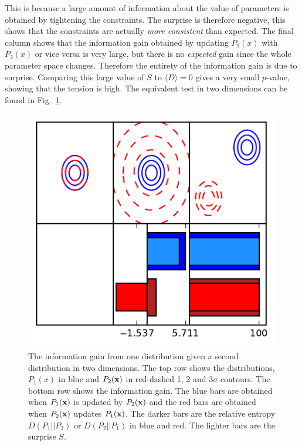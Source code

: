 \documentclass[twocolumn]{revtex4-1}
\begin{document}
    This is because a large amount of information about the value of parameters is obtained by tightening the constraints.
    The surprise is therefore negative, this shows that the constraints are actually \emph{more consistent} than expected.
    The final column shows that the information gain obtained by updating $P_1(x)$ with $P_2(x)$ or vice versa is very large, but there is no \emph{expected} gain since the whole parameter space changes.
    Therefore the entirety of the information gain is due to surprise. 
    Comparing this large value of $S$ to $\langle D\rangle = 0$ gives a very small $p$-value, showing that the tension is high.
    The equivalent test in two dimensions can be found in Fig.~\ref{fig:surprise_2D}.
    \begin{figure}
        \centering
        \includegraphics{../comparison/plots/surprise_2D.pdf}
        \caption{The information gain from one distribution given a second distribution in two dimensions.
                 The top row shows the distributions, $P_1(x)$ in blue and $P_2({\bf x})$ in red-dashed 1, 2 and 3$\sigma$ contours.
                 The bottom row shows the information gain.
                 The blue bars are obtained when $P_1({\bf x})$ is updated by $P_2({\bf x})$ and the red bars are obtained when $P_2({\bf x})$ updates $P_1({\bf x})$.
                 The darker bars are the relative entropy $D(P_1||P_2)$ or $D(P_2||P_1)$ in blue and red.
                 The lighter bars are the surprise $S$.}
        \label{fig:surprise_2D}
    \end{figure}
\end{document}

